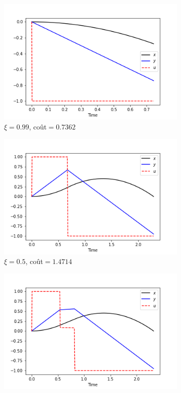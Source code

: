 \documentclass[
	french,
	11pt, %
]{fphw}
\begin{document}
\begin{figure}[H]
    \centering
    \begin{subfigure}[b]{0.32\textwidth}
        \includegraphics[width=\textwidth]{Exo21.png}
        \caption{$\xi = 0.99$, coût$=0.7362$}
        \label{fig:21}
    \end{subfigure}
    \begin{subfigure}[b]{0.32\textwidth}
        \includegraphics[width=\textwidth]{Exo22.png}
        \caption{$\xi = 0.5$, coût$=1.4714$}
        \label{fig:22}
	\end{subfigure}
    \begin{subfigure}[b]{0.32\textwidth}
        \includegraphics[width=\textwidth]{Exo23.png}

\end{subfigure}
\end{figure}
\end{document}

